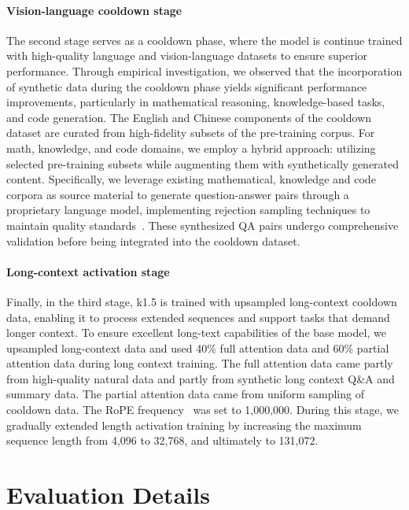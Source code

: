 \documentclass{article}
\newcommand{\citep}[1]{\parencite{#1}}
\begin{document}
\paragraph{Vision-language cooldown stage}
The second stage serves as a cooldown phase, where the model is continue trained with high-quality language and vision-language datasets to ensure superior performance. 
Through empirical investigation, we observed that the incorporation of synthetic data during the cooldown phase yields significant performance improvements, particularly in mathematical reasoning, knowledge-based tasks, and code generation.
The English and Chinese components of the cooldown dataset are curated from high-fidelity subsets of the pre-training corpus. For math, knowledge, and code domains, we employ a hybrid approach: utilizing selected pre-training subsets while augmenting them with synthetically generated content. Specifically, we leverage existing mathematical, knowledge and code corpora as source material to generate question-answer pairs through a proprietary language model, implementing rejection sampling techniques to maintain quality standards~\citep{yue2023mammoth,su2024nemotron}. These synthesized QA pairs undergo comprehensive validation before being integrated into the cooldown dataset.

\paragraph{Long-context activation stage}
Finally, in the third stage, k1.5 is trained with upsampled long-context cooldown data, enabling it to process extended sequences and support tasks that demand longer context. To ensure excellent long-text capabilities of the base model, we upsampled long-context data and used 40\% full attention data and 60\% partial attention data during long context training. The full attention data came partly from high-quality natural data and partly from synthetic long context Q\&A and summary data. The partial attention data came from uniform sampling of cooldown data.
The RoPE frequency~\citep{su2024roformer} was set to 1,000,000. During this stage, we gradually extended length activation training by increasing the maximum sequence length from 4,096 to 32,768, and ultimately to 131,072.

\section{Evaluation Details}
\label{sec:appendix_eval_detail}
\end{document}
